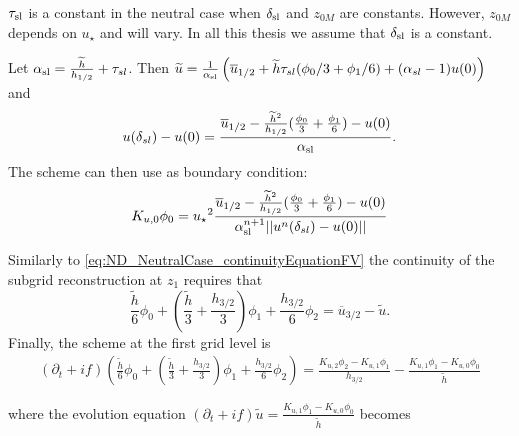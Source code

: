 \begin{remark}
$\tau_{\rm sl}$ is a constant in the neutral case
when $\delta_{\rm sl}$ and $z_{0M}$ are constants. However,
$z_{0M}$ depends on $u_\star$ and will vary.
In all this thesis we assume that $\delta_{\rm sl}$ is a constant.
\end{remark}

Let $\alpha_{\rm sl} = \frac{\widetilde{h}}{h_{1/2}}+\tau_{sl}$.
Then $\widetilde{u} = \frac{1}{\alpha_{\rm sl}}\left(
\overline{u}_{1/2} + \widetilde{h}\tau_{sl}(\phi_0/3 + \phi_1/6)
+ (\alpha_{sl} - 1)  u(0)\right)$
and
\begin{equation}
u(\delta_{sl})-u(0)=\frac{\overline{u}_{1/2} -
	\frac{\widetilde{h}^2}{h_{1/2}}
	(\frac{\phi_0}{3} + \frac{\phi_1}{6}) - u(0)}
	{\alpha_{\rm sl}}.
\end{equation}
The scheme can then use as boundary condition:
\begin{equation}
	\label{eq:ND_NeutralCase_boundaryCondFVfree}
	K_{u,0} \phi_0 = {u_\star}^2
	\frac{\overline{u}_{1/2} - \frac{\widetilde{h}^2}{h_{1/2}}
	(\frac{\phi_0}{3} + \frac{\phi_1}{6})-u(0)}
	{\alpha_{\rm sl}^{n+1}||u^n(\delta_{sl}) - u(0)||}
\end{equation}

Similarly to \eqref{eq:ND_NeutralCase_continuityEquationFV}
the continuity of the subgrid reconstruction at $z_1$ requires that
\begin{equation}
	\label{eq:ND_NeutralCase_continuityFVfree}
    \frac{\widetilde{h}}{6} 
    \phi_0
    +
    (\frac{\widetilde{h}}{3} 
    + \frac{h_{3/2}}{3})
    \phi_1
    + \frac{h_{3/2}}{6} \phi_2
     = \overline{u}_{3/2} - 
     \widetilde{u}.
\end{equation}
Finally, the scheme at the first grid level is
\begin{equation}
	\label{eq:ND_NeutralCase_prognosticEqFVfree}
    \begin{aligned}
(\partial_t + if)
    \left(\frac{\widetilde{h}}{6} 
    \phi_0
    +
    \left(
    \frac{\widetilde{h}}{3} 
    + \frac{h_{3/2}}{3}
    \right)
    \phi_1
    + \frac{h_{3/2}}{6} \phi_2\right)
    =
	    \frac{K_{u,2} \phi_2 - K_{u,1} \phi_1}{h_{3/2}} - \frac{K_{u,1} \phi_1 - K_{u,0} \phi_0 }{\widetilde{h}}
    \end{aligned}
\end{equation}

where the evolution equation 
$ (\partial_t+if) \widetilde{u}
= \frac{K_{u, 1}\phi_1 - K_{u,0} \phi_0}{\widetilde{h}}$ becomes

